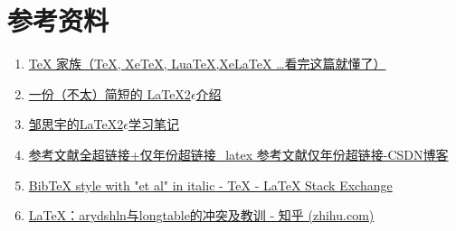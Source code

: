 \chapter*{参考资料}\label{chap:refinfor}
\begin{enumerate}[itemsep=1.5ex]
    \item \href{https://zhuanlan.zhihu.com/p/248669482}{TeX 家族（TeX, XeTeX, LuaTeX,XeLaTeX …看完这篇就懂了）}
    \item \href{http://mirrors.ctan.org/info/lshort/chinese/lshort-zh-cn.pdf}{一份（不太）简短的 \LaTeX{}2$\epsilon$介绍}
    \item \href{https://github.com/zousiyu1995/Study-LaTeX}{邹思宇的\LaTeX{}2$\epsilon$学习笔记}
    \item \href{https://blog.csdn.net/qq_36829039/article/details/123576507}{参考文献全超链接+仅年份超链接\_latex 参考文献仅年份超链接-CSDN博客}
    \item \href{https://tex.stackexchange.com/questions/532367/bibtex-style-with-et-al-in-italic}{BibTeX style with "et al" in italic - TeX - LaTeX Stack Exchange}
    \item \href{https://zhuanlan.zhihu.com/p/667681242}{LaTeX：arydshln与longtable的冲突及教训 - 知乎 (zhihu.com)}
\end{enumerate}
